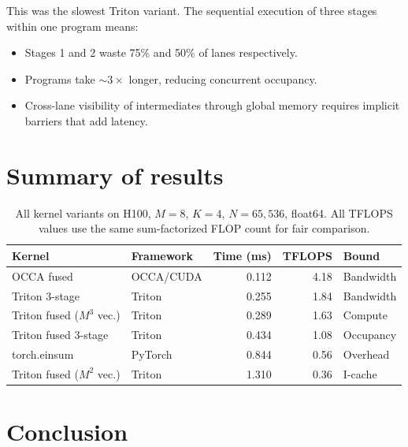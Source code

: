 \documentclass[11pt]{article}
\begin{document}
\begin{center}
\end{center}

This was the slowest Triton variant.  The sequential execution of three
stages within one program means:
\begin{itemize}
  \item Stages 1 and 2 waste 75\% and 50\% of lanes respectively.
  \item Programs take $\sim\!3\times$ longer, reducing concurrent occupancy.
  \item Cross-lane visibility of intermediates through global memory
    requires implicit barriers that add latency.
\end{itemize}

\section{Summary of results}

\begin{table}[H]
\centering
\begin{tabular}{llrrl}
\toprule
\textbf{Kernel} & \textbf{Framework} & \textbf{Time (ms)} & \textbf{TFLOPS} & \textbf{Bound} \\
\midrule
OCCA fused                      & OCCA/CUDA & 0.112 & 4.18 & Bandwidth \\
Triton 3-stage                  & Triton    & 0.255 & 1.84 & Bandwidth \\
Triton fused ($M^3$ vec.)       & Triton    & 0.289 & 1.63 & Compute \\
Triton fused 3-stage            & Triton    & 0.434 & 1.08 & Occupancy \\
torch.einsum                    & PyTorch   & 0.844 & 0.56 & Overhead \\
Triton fused ($M^2$ vec.)       & Triton    & 1.310 & 0.36 & I-cache \\
\bottomrule
\end{tabular}
\caption{All kernel variants on H100, $M=8$, $K=4$, $N=65{,}536$, float64.
  All TFLOPS values use the same sum-factorized FLOP count for fair comparison.}
\label{tab:summary}
\end{table}

\section{Conclusion}
\end{document}
